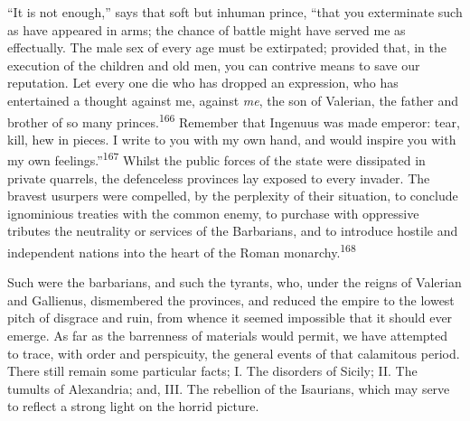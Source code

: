 “It is not enough,” says that soft but inhuman prince, “that you
exterminate such as have appeared in arms; the chance of battle
might have served me as effectually. The male sex of every age
must be extirpated; provided that, in the execution of the
children and old men, you can contrive means to save our
reputation. Let every one die who has dropped an expression, who
has entertained a thought against me, against \textit{me}, the son of
Valerian, the father and brother of so many princes.\textsuperscript{166} Remember
that Ingenuus was made emperor: tear, kill, hew in pieces. I
write to you with my own hand, and would inspire you with my own
feelings.”\textsuperscript{167} Whilst the public forces of the state were
dissipated in private quarrels, the defenceless provinces lay
exposed to every invader. The bravest usurpers were compelled, by
the perplexity of their situation, to conclude ignominious
treaties with the common enemy, to purchase with oppressive
tributes the neutrality or services of the Barbarians, and to
introduce hostile and independent nations into the heart of the
Roman monarchy.\textsuperscript{168}




Such were the barbarians, and such the tyrants, who, under the
reigns of Valerian and Gallienus, dismembered the provinces, and
reduced the empire to the lowest pitch of disgrace and ruin, from
whence it seemed impossible that it should ever emerge. As far as
the barrenness of materials would permit, we have attempted to
trace, with order and perspicuity, the general events of that
calamitous period. There still remain some particular facts; I.
The disorders of Sicily; II. The tumults of Alexandria; and, III.
The rebellion of the Isaurians, which may serve to reflect a
strong light on the horrid picture.

